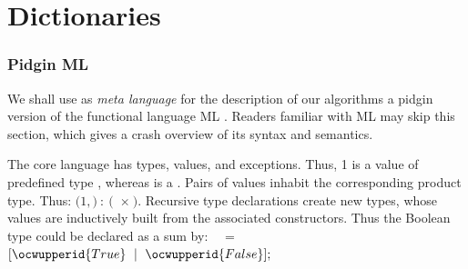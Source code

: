 \documentclass[12pt]{article}
\begin{document}
\begin{abstract}
This toolkit was abstracted from the Sanskrit ML Library, which constitutes
its first large-scale application. Thus some of this material already
appeared in the documentation of the Sanskrit Segmenter algorithm,
which solves Sandhi Analysis \cite{2004-Huet-1}.

This document was automatically generated from the code of the toolkit
using the Ocamlweb package of Jean-Christophe Filli\^atre,
with the Latex package, in the literate programming style pioneered by
Don Knuth. 

\end{abstract}

\part{Dictionaries}

\section{Pidgin ML}

We shall use as {\sl meta language} for the description of our algorithms
a pidgin version of the functional language ML 
\cite{ML-LCF,MLer,paulson,caml}. 
Readers familiar with ML
may skip this section, which gives a crash
overview of its syntax and semantics.

\label{../ML/pidgin.ml:0}%
The core language has types, values, and exceptions. 
Thus, \ocwbegindcode{}1\ocwenddcode{} is a value of predefined type \ocwbegindcode{}\ocwenddcode{}, whereas 
\ocwbegindcode{}\ocwenddcode{} is a \ocwbegindcode{}\ocwenddcode{}. 
Pairs of values inhabit the corresponding product type. Thus:
\ocwbegindcode{}$(1,$$)~:~($~$\times{}~$$)$\ocwenddcode{}. 
Recursive type declarations create new types,
whose values are inductively built from the associated constructors. 
Thus the Boolean type could be declared
as a sum by: 
\ocweol
\label{../ML/pidgin.ml:1092}%
\medskip
\ocwbegincode{}\ocwindent{0.00em}
~~=~$[\ocwupperid{True}~\mid{}~\ocwupperid{False}];$\medskip
\end{document}
